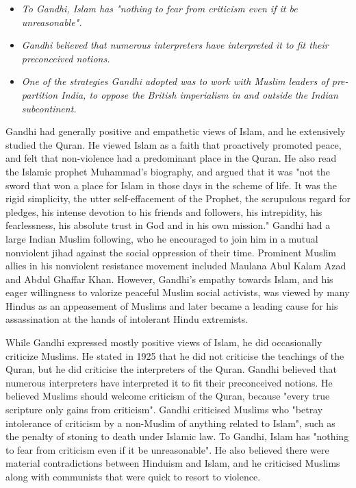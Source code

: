 \begin{itemize}
\item
  \emph{To Gandhi, Islam has "nothing to fear from criticism even if it
  be unreasonable".}
\item
  \emph{Gandhi believed that numerous interpreters have interpreted it
  to fit their preconceived notions.}
\item
  \emph{One of the strategies Gandhi adopted was to work with Muslim
  leaders of pre-partition India, to oppose the British imperialism in
  and outside the Indian subcontinent.}
\end{itemize}

Gandhi had generally positive and empathetic views of Islam, and he
extensively studied the Quran. He viewed Islam as a faith that
proactively promoted peace, and felt that non-violence had a predominant
place in the Quran. He also read the Islamic prophet Muhammad's
biography, and argued that it was "not the sword that won a place for
Islam in those days in the scheme of life. It was the rigid simplicity,
the utter self-effacement of the Prophet, the scrupulous regard for
pledges, his intense devotion to his friends and followers, his
intrepidity, his fearlessness, his absolute trust in God and in his own
mission." Gandhi had a large Indian Muslim following, who he encouraged
to join him in a mutual nonviolent jihad against the social oppression
of their time. Prominent Muslim allies in his nonviolent resistance
movement included Maulana Abul Kalam Azad and Abdul Ghaffar Khan.
However, Gandhi's empathy towards Islam, and his eager willingness to
valorize peaceful Muslim social activists, was viewed by many Hindus as
an appeasement of Muslims and later became a leading cause for his
assassination at the hands of intolerant Hindu extremists.

While Gandhi expressed mostly positive views of Islam, he did
occasionally criticize Muslims. He stated in 1925 that he did not
criticise the teachings of the Quran, but he did criticise the
interpreters of the Quran. Gandhi believed that numerous interpreters
have interpreted it to fit their preconceived notions. He believed
Muslims should welcome criticism of the Quran, because "every true
scripture only gains from criticism". Gandhi criticised Muslims who
"betray intolerance of criticism by a non-Muslim of anything related to
Islam", such as the penalty of stoning to death under Islamic law. To
Gandhi, Islam has "nothing to fear from criticism even if it be
unreasonable". He also believed there were material contradictions
between Hinduism and Islam, and he criticised Muslims along with
communists that were quick to resort to violence.

